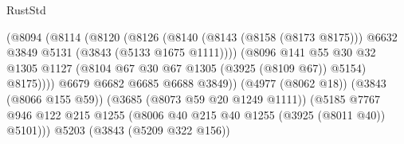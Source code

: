 \begin{lexlean}{RustStd}
\begin{coremodule}
                                                (@8094
                                                  (@8114
                                                    (@8120
                                                      (@8126
                                                        (@8140
                                                          (@8143 (@8158 (@8173 @8175)))
                                                          @6632
                                                          @3849
                                                          @5131
                                                          (@3843 (@5133 @1675 @1111))))
                                                      (@8096
                                                        @141
                                                        @55
                                                        @30
                                                        @32
                                                        @1305
                                                        @1127
                                                        (@8104
                                                          @67
                                                          @30
                                                          @67
                                                          @1305
                                                          (@3925 (@8109 @67))
                                                          @5154)
                                                        @8175))))
                                                @6679
                                                @6682
                                                @6685
                                                @6688
                                                @3849))
                                            (@4977 (@8062 @18))
                                            (@3843 (@8066 @155 @59))
                                            (@3685 (@8073 @59 @20 @1249 @1111))
                                            (@5185
                                              @7767
                                              @946
                                              @122
                                              @215
                                              @1255
                                              (@8006 @40 @215 @40 @1255 (@3925 (@8011 @40)) @5101)))
                                          @5203
                                          (@3843 (@5209 @322 @156))

\end{coremodule}
\end{lexlean}
